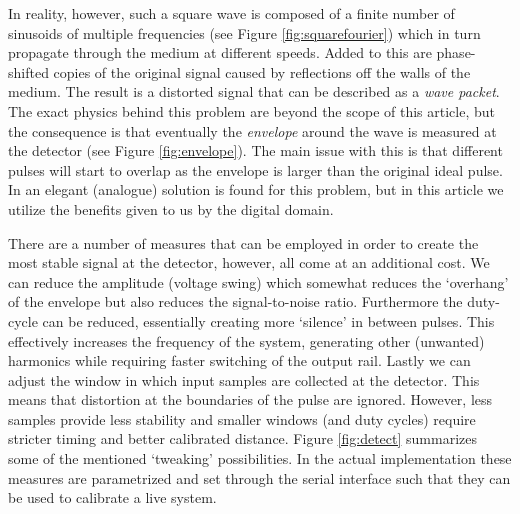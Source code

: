\documentclass[10pt,a4paper,twocolumn]{article}
\begin{document}
In reality, however, such a square wave is composed of a finite number of sinusoids of multiple frequencies (see Figure \ref{fig:squarefourier}) which in turn propagate through the medium at different speeds. Added to this are phase-shifted copies of the original signal caused by reflections off the walls of the medium. The result is a distorted signal that can be described as a \emph{wave packet}. The exact physics behind this problem are beyond the scope of this article, but the consequence is that eventually the \emph{envelope} around the wave is measured at the detector (see Figure \ref{fig:envelope}). The main issue with this is that different pulses will start to overlap as the envelope is larger than the original ideal pulse. In \cite{auerbach} an elegant (analogue) solution is found for this problem, but in this article we utilize the benefits given to us by the digital domain.

There are a number of measures that can be employed in order to create the most stable signal at the detector, however, all come at an additional cost. We can reduce the amplitude (voltage swing) which somewhat reduces the `overhang' of the envelope but also reduces the signal-to-noise ratio. Furthermore the duty-cycle can be reduced, essentially creating more `silence' in between pulses. This effectively increases the frequency of the system, generating other (unwanted) harmonics while requiring faster switching of the output rail. Lastly we can adjust the window in which input samples are collected at the detector. This means that distortion at the boundaries of the pulse are ignored. However, less samples provide less stability and smaller windows (and duty cycles) require stricter timing and better calibrated distance.  Figure \ref{fig:detect} summarizes some of the mentioned `tweaking' possibilities. In the actual implementation these measures are parametrized and set through the serial interface such that they can be used to calibrate a live system.
\end{document}
